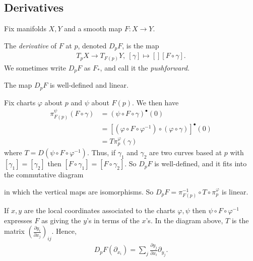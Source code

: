 \subsection{Derivatives} Fix manifolds $X,Y$ and a smooth map $F:X\to Y$.
\begin{defn}\label{defn:lec1.40}
	The \emph{derivative} of $F$ at $p$, denoted $D_pF$, is the map
	\begin{align*}
		T_pX \to T_{F(p)}Y, ~ [\gamma] \mapsto[]{} [F\circ \gamma].
	\end{align*}
	We sometimes write $D_pF$ as $F_*$, and call it the \emph{pushforward.}
\end{defn}
\begin{lem}\label{lem:1.41}
	The map $D_pF$ is well-defined and linear.
\end{lem}
\begin{prf}
	Fix charts $\varphi$ about $p$ and $\psi$ about $F(p)$. We then have
	\begin{align*}
		\pi^{\psi}_{F(p)}(F\circ \gamma) &= (\psi \circ F \circ \gamma)^\bullet(0) \\
										 &= [(\varphi\circ F\circ \varphi^{-1}) \circ (\varphi\circ \gamma)]^\bullet (0) \\
										 &= T\pi_p^{\varphi}(\gamma)
	\end{align*}
	where $T = D(\psi \circ F \circ \varphi^{-1})$. Thus, if $\gamma_1$ and $\gamma_2$ are two curves based at $p$ with $[\gamma_1] = [\gamma_2]$ then $[F\circ \gamma_1] = [F\circ \gamma_2]$. So $D_p F$ is well-defined, and it fits into the commutative diagram
	\begin{center}
	\end{center}
	in which the vertical maps are isomorphisms. So $D_pF = \pi_{F(p)}^{-1} \circ T\circ \pi_p^\varphi$ is linear.
\end{prf}

\begin{rmk}\label{rmk:lec1.41}
	If $x,y$ are the local coordinates associated to the charts $\varphi, \psi$ then $\psi\circ F\circ \varphi^{-1}$ expresses $F$ as giving the $y$'s in terms of the $x$'s. In the diagram above, $T$ is the matrix $\left(\frac{\partial y_i}{\partial x_j}\right)_{ij}$. Hence,
	\begin{align*}
		D_p F(\partial_{x_i}) = \sum_j \frac{\partial y_j}{\partial x_i} \partial_{y_j}.
	\end{align*}
\end{rmk}

